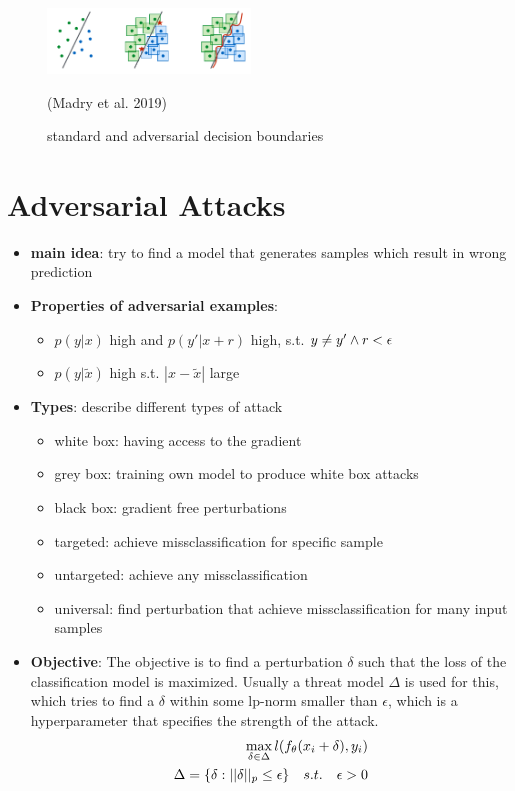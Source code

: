 \documentclass[conference]{IEEEtran}
\begin{document}
\begin{figure}[ht]
  \centering
  \vspace{-0.0cm}
  \includegraphics[width=0.48\textwidth]{decision_boundaries.png}
  \label{fig: standard and adversarial decision boundaries}
  \caption{standard and adversarial decision boundaries} (Madry et al. 2019)
\end{figure}

\section{Adversarial Attacks}
\begin{itemize}
  \item \textbf{main idea}: try to find a model that generates samples which result in wrong prediction
  \item \textbf{Properties of adversarial examples}:
  \begin{itemize}
    \item $p(y|x)$ high and $p(y'|x+r)$ high, s.t. $y \neq y' \space \wedge \space r < \epsilon$
    \item $p(y|\tilde{x})$ high s.t. $|x - \tilde{x}|$ large
  \end{itemize}
  \item \textbf{Types}: describe different types of attack
  \begin{itemize}
    \item white box: having access to the gradient
    \item grey box: training own model to produce white box attacks
    \item black box: gradient free perturbations
    \item targeted: achieve missclassification for specific sample
    \item untargeted: achieve any missclassification
    \item universal: find perturbation that achieve missclassification for many input samples \\
  \end{itemize}
  \item \textbf{Objective}: The objective is to find a perturbation $\delta$ such that the loss of the classification model is maximized. Usually a threat model $\Delta$ is used for this, which tries to find a $\delta$ within some lp-norm smaller than $\epsilon$, which is a hyperparameter that specifies the strength of the attack. 
  \begin{align*}
    \max_{\delta \in \Delta} \space l(f_{\theta}(x_i + \delta), y_i)  \\
  \Delta = \{\delta : ||\delta||_p \leq \epsilon\} \quad s.t. \quad \epsilon > 0 \\
  \end{align*}
\end{itemize}
\end{document}
